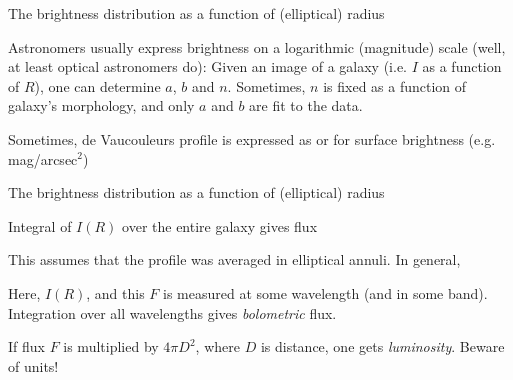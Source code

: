 \documentclass[letterpaper,landscape]{slides}
\begin{document}
\begin{slide}
\begin{center}
{\large \color{red} 
       The brightness distribution as a function of (elliptical) radius  }
\end{center}


Astronomers usually express brightness on a logarithmic (magnitude) scale
(well, at least optical astronomers do):
Given an image of a galaxy (i.e. $I$ as a function of $R$), one can 
determine $a$, $b$ and $n$. Sometimes, $n$ is fixed as a function
of galaxy's morphology, and only $a$ and $b$ are fit to the data.

Sometimes, de Vaucouleurs profile is expressed as
or for surface brightness (e.g. mag/arcsec$^2$)


\vfill
\end{slide}




\begin{slide}
\begin{center}
{\large \color{red} 
       The brightness distribution as a function of (elliptical) radius  }
\end{center}


Integral of $I(R)$ over the entire galaxy gives flux

This assumes that the profile was averaged in elliptical annuli. 
In general,

Here, $I(R)$, and this $F$ is measured at some wavelength (and in 
some band). Integration over all wavelengths gives {\it bolometric}
flux. 

If flux $F$ is multiplied by $4 \pi D^2$, where $D$ is distance, 
one gets {\it luminosity}. Beware of units! 



\vfill
\end{slide}







\end{document}
